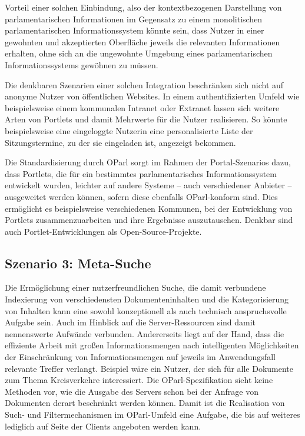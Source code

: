 \documentclass[,a4paper]{article}
\begin{document}
Vorteil einer solchen Einbindung, also der kontextbezogenen Darstellung
von parlamentarischen Informationen im Gegensatz zu einem monolitischen
parlamentarischen Informationssystem könnte sein, dass Nutzer in einer
gewohnten und akzeptierten Oberfläche jeweils die relevanten
Informationen erhalten, ohne sich an die ungewohnte Umgebung eines
parlamentarischen Informationssystems gewöhnen zu müssen.

Die denkbaren Szenarien einer solchen Integration beschränken sich nicht
auf anonyme Nutzer von öffentlichen Websites. In einem authentifizierten
Umfeld wie beispielsweise einem kommunalen Intranet oder Extranet lassen
sich weitere Arten von Portlets und damit Mehrwerte für die Nutzer
realisieren. So könnte beispielsweise eine eingeloggte Nutzerin eine
personalisierte Liste der Sitzungstermine, zu der sie eingeladen ist,
angezeigt bekommen.

Die Standardisierung durch OParl sorgt im Rahmen der Portal-Szenarios
dazu, dass Portlets, die für ein bestimmtes parlamentarisches
Informationssystem entwickelt wurden, leichter auf andere Systeme --
auch verschiedener Anbieter -- ausgeweitet werden können, sofern diese
ebenfalls OParl-konform sind. Dies ermöglicht es beispielsweise
verschiedenen Kommunen, bei der Entwicklung von Portlets
zusammenzuarbeiten und ihre Ergebnisse auszutauschen. Denkbar sind auch
Portlet-Entwicklungen als Open-Source-Projekte.

\subsection{Szenario 3: Meta-Suche}\label{szenarioux5fmetaux5fsuche}

Die Ermöglichung einer nutzerfreundlichen Suche, die damit verbundene
Indexierung von verschiedensten Dokumenteninhalten und die
Kategorisierung von Inhalten kann eine sowohl konzeptionell als auch
technisch anspruchsvolle Aufgabe sein. Auch im Hinblick auf die
Server-Ressourcen sind damit nennenswerte Aufwände verbunden.
Andererseits liegt auf der Hand, dass die effiziente Arbeit mit großen
Informationsmengen nach intelligenten Möglichkeiten der Einschränkung
von Informationsmengen auf jeweils im Anwendungsfall relevante Treffer
verlangt. Beispiel wäre ein Nutzer, der sich für alle Dokumente zum
Thema Kreisverkehre interessiert. Die OParl-Spezifikation sieht keine
Methoden vor, wie die Ausgabe des Servers schon bei der Anfrage von
Dokumenten derart beschränkt werden können. Damit ist die Realisation
von Such- und Filtermechanismen im OParl-Umfeld eine Aufgabe, die bis
auf weiteres lediglich auf Seite der Clients angeboten werden kann.
\end{document}
